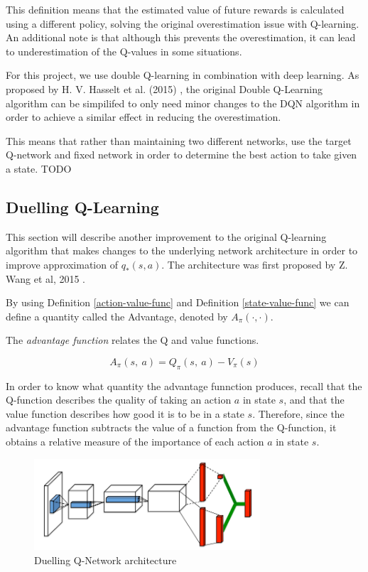 This definition means that the estimated value of future rewards is calculated using a different policy, solving the original overestimation issue with Q-learning. An additional note is that although this prevents the overestimation, it can lead to underestimation of the Q-values in some situations.

For this project, we use double Q-learning in combination with deep learning. As proposed by H. V. Hasselt et al. (2015) \cite{deep-double-qlearning}, the original Double Q-Learning algorithm can be simpilifed to only need minor changes to the DQN algorithm in order to achieve a similar effect in reducing the overestimation.

This means that rather than maintaining two different networks, use the target Q-network and fixed network in order to determine the best action to take given a state.
TODO

\subsection{Duelling Q-Learning}
\label{dsgn:sec:qlearning:dueldqn}

This section will describe another improvement to the original Q-learning algorithm that makes changes to the underlying network architecture in order to improve approximation of $q_*(s, a)$. The architecture was first proposed by Z. Wang et al, 2015 \cite{wang2015dueling}.

By using Definition \ref{action-value-func} and Definition \ref{state-value-func} we can define a quantity called the Advantage, denoted by $A_\pi(\cdot, \cdot)$.

\begin{defn}
	\label{advantage-func}
	The \textit{advantage function} relates the Q and value functions.

	\[
		A_\pi(s,~a) = Q_\pi(s,~a) - V_\pi(s)
	\]
\end{defn}

In order to know what quantity the advantage funnction produces, recall that the Q-function describes the quality of taking an action $a$ in state $s$, and that the value function describes how good it is to be in a state $s$. Therefore, since the advantage function subtracts the value of a function from the Q-function, it obtains a relative measure of the importance of each action $a$ in state $s$.

\begin{figure}[htbp]
	\centering
	\includegraphics[width=0.75\textwidth]{chapters/chapter3/images/duelling.png}
	\caption{Duelling Q-Network architecture
		\label{fig:duelling-arch}
	}
\end{figure}

